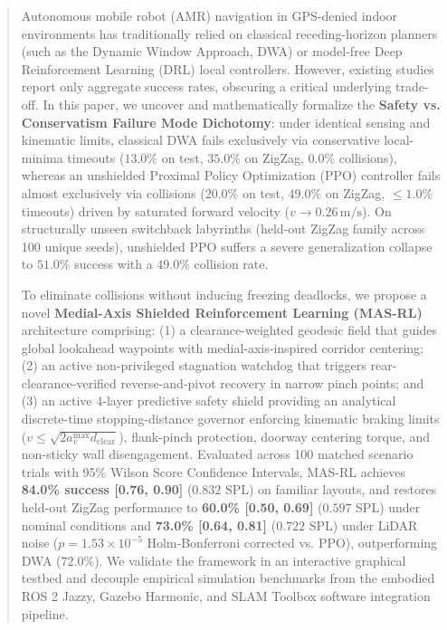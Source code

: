 \documentclass[runningheads]{llncs}
\begin{document}
\begin{abstract}
Autonomous mobile robot (AMR) navigation in GPS-denied indoor environments has traditionally relied on classical receding-horizon planners (such as the Dynamic Window Approach, DWA) or model-free Deep Reinforcement Learning (DRL) local controllers. However, existing studies report only aggregate success rates, obscuring a critical underlying trade-off. In this paper, we uncover and mathematically formalize the \textbf{Safety vs. Conservatism Failure Mode Dichotomy}: under identical sensing and kinematic limits, classical DWA fails exclusively via conservative local-minima timeouts ($13.0\%$ on test, $35.0\%$ on ZigZag, $0.0\%$ collisions), whereas an unshielded Proximal Policy Optimization (PPO) controller fails almost exclusively via collisions ($20.0\%$ on test, $49.0\%$ on ZigZag, $\le 1.0\%$ timeouts) driven by saturated forward velocity ($v \to 0.26\,\text{m/s}$). On structurally unseen switchback labyrinths (held-out ZigZag family across 100 unique seeds), unshielded PPO suffers a severe generalization collapse to $51.0\%$ success with a $49.0\%$ collision rate.

To eliminate collisions without inducing freezing deadlocks, we propose a novel \textbf{Medial-Axis Shielded Reinforcement Learning (MAS-RL)} architecture comprising: (1) a clearance-weighted geodesic field that guides global lookahead waypoints with medial-axis-inspired corridor centering; (2) an active non-privileged stagnation watchdog that triggers rear-clearance-verified reverse-and-pivot recovery in narrow pinch points; and (3) an active 4-layer predictive safety shield providing an analytical discrete-time stopping-distance governor enforcing kinematic braking limits ($v \le \sqrt{2 a_v^{\max} d_{\text{clear}}}$), flank-pinch protection, doorway centering torque, and non-sticky wall disengagement. Evaluated across 100 matched scenario trials with 95\% Wilson Score Confidence Intervals, MAS-RL achieves \textbf{84.0\% success [0.76, 0.90]} ($0.832$ SPL) on familiar layouts, and restores held-out ZigZag performance to \textbf{60.0\% [0.50, 0.69]} ($0.597$ SPL) under nominal conditions and \textbf{73.0\% [0.64, 0.81]} ($0.722$ SPL) under LiDAR noise ($p = 1.53 \times 10^{-5}$ Holm-Bonferroni corrected vs. PPO), outperforming DWA ($72.0\%$). We validate the framework in an interactive graphical testbed and decouple empirical simulation benchmarks from the embodied ROS 2 Jazzy, Gazebo Harmonic, and SLAM Toolbox software integration pipeline.

\end{abstract}
\end{document}
